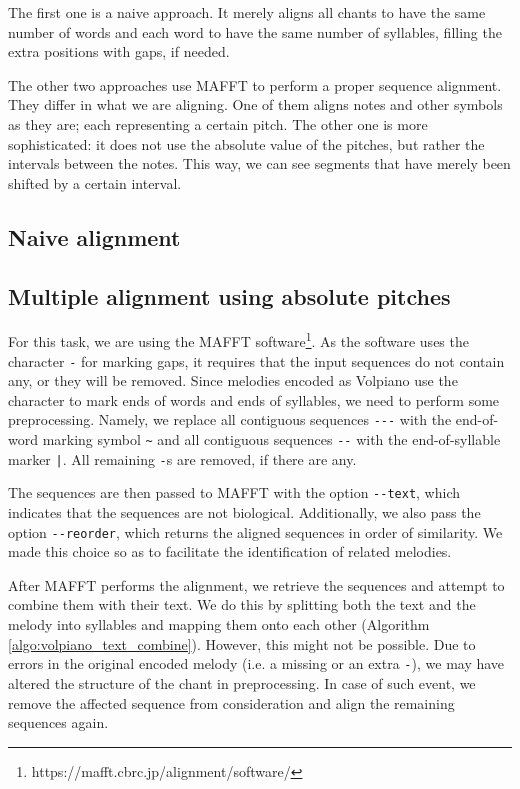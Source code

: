 The first one is a naive approach. It merely aligns all chants to have the same number of words and each word to have the same number of syllables, filling the extra
positions with gaps, if needed.

The other two approaches use MAFFT to perform a proper sequence alignment. They differ in what we are aligning. One of them aligns notes and other symbols as they are;
each representing a certain pitch. The other one is more sophisticated: it does not use the absolute value of the pitches, but rather the intervals between the notes.
This way, we can see segments that have merely been shifted by a certain interval.

\subsection{Naive alignment}

\subsection{Multiple alignment using absolute pitches}

For this task, we are using the MAFFT software\footnote{https://mafft.cbrc.jp/alignment/software/}. As the software uses the character \verb|-| for marking gaps,
it requires that the input sequences do not contain any, or they will be removed. Since melodies encoded as Volpiano use the character to mark ends of words
and ends of syllables, we need to perform some preprocessing. Namely, we replace all contiguous sequences \verb|---| with the end-of-word marking symbol \verb|~|
and all contiguous sequences \verb|--| with the end-of-syllable marker \verb=|=. All remaining \verb|-|s are removed, if there are any.

The sequences are then passed to MAFFT with the option \verb|--text|, which indicates that the sequences are not biological. Additionally, we also pass the option
\verb|--reorder|, which returns the aligned sequences in order of similarity. We made this choice so as to facilitate the identification of related melodies.

After MAFFT performs the alignment, we retrieve the sequences and attempt to combine them with their text.
We do this by splitting both the text and the melody into syllables and mapping them onto each other (Algorithm \ref{algo:volpiano_text_combine}). 
However, this might not be possible. Due to errors in the original encoded melody (i.e. a missing or an extra \verb|-|),
we may have altered the structure of the chant in preprocessing. In case of such event, we remove the affected sequence from consideration and align the remaining
sequences again.\newline

